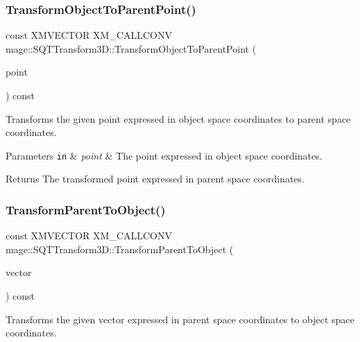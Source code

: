 \subsubsection{\texorpdfstring{Transform\+Object\+To\+Parent\+Point()}{TransformObjectToParentPoint()}}
{\footnotesize\ttfamily const X\+M\+V\+E\+C\+T\+OR X\+M\+\_\+\+C\+A\+L\+L\+C\+O\+NV mage\+::\+S\+Q\+T\+Transform3\+D\+::\+Transform\+Object\+To\+Parent\+Point (\begin{DoxyParamCaption}\item[{F\+X\+M\+V\+E\+C\+T\+OR}]{point }\end{DoxyParamCaption}) const\hspace{0.3cm}{\ttfamily [noexcept]}}

Transforms the given point expressed in object space coordinates to parent space coordinates.


\begin{DoxyParams}[1]{Parameters}
\mbox{\tt in}  & {\em point} & The point expressed in object space coordinates. \\
\hline
\end{DoxyParams}
\begin{DoxyReturn}{Returns}
The transformed point expressed in parent space coordinates. 
\end{DoxyReturn}
\mbox{\label{classmage_1_1_s_q_t_transform3_d_a1e4ec9b36b1cc9b90e51b33977d4aff0}} 
\subsubsection{\texorpdfstring{Transform\+Parent\+To\+Object()}{TransformParentToObject()}}
{\footnotesize\ttfamily const X\+M\+V\+E\+C\+T\+OR X\+M\+\_\+\+C\+A\+L\+L\+C\+O\+NV mage\+::\+S\+Q\+T\+Transform3\+D\+::\+Transform\+Parent\+To\+Object (\begin{DoxyParamCaption}\item[{F\+X\+M\+V\+E\+C\+T\+OR}]{vector }\end{DoxyParamCaption}) const\hspace{0.3cm}{\ttfamily [noexcept]}}

Transforms the given vector expressed in parent space coordinates to object space coordinates.


